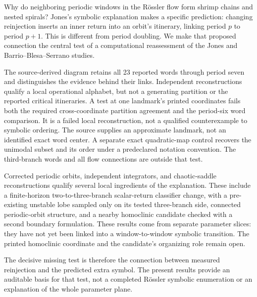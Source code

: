 Why do neighboring periodic windows in the R{\"o}ssler flow form shrimp chains
and nested spirals? Jones's symbolic explanation makes a specific prediction:
changing reinjection inserts an inner return into an orbit's itinerary,
linking period $p$ to period $p+1$. This is different from period doubling.
We make that proposed connection the central test of a computational
reassessment of the Jones and Barrio--Blesa--Serrano studies.

The source-derived diagram retains all 23 reported words through period seven
and distinguishes the evidence behind their links. Independent reconstructions
qualify a local operational alphabet, but not a generating partition or the
reported critical itineraries. A test at one landmark's printed coordinates
fails both the required cross-coordinate partition agreement and the
period-six word comparison. It is a failed local reconstruction, not a
qualified counterexample to symbolic ordering. The source supplies an
approximate landmark, not an identified exact word center.
A separate exact quadratic-map control recovers the unimodal subset and
its order under a predeclared notation convention. The third-branch words
and all flow connections are outside that test.

Corrected periodic orbits, independent integrators, and chaotic-saddle
reconstructions qualify several local ingredients of the explanation. These
include a finite-horizon two-to-three-branch scalar-return classifier change,
with a pre-existing unstable lobe sampled only on its tested three-branch
side, connected periodic-orbit structure, and a nearby
homoclinic candidate checked with a second boundary formulation. These results
come from separate parameter slices: they have not yet been linked into a
window-to-window symbolic transition. The printed homoclinic coordinate and
the candidate's organizing role remain open.

The decisive missing test is therefore the connection between measured
reinjection and the predicted extra symbol. The present results provide
an auditable basis for that test, not a completed R{\"o}ssler symbolic enumeration or
an explanation of the whole parameter plane.
